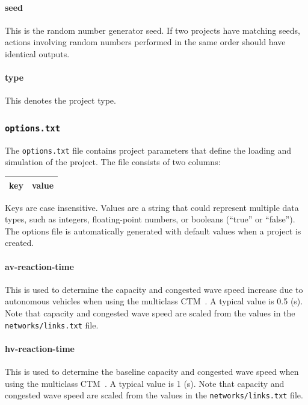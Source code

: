 \paragraph*{seed}
This is the random number generator seed. If two projects have matching seeds, actions involving random numbers performed in the same order should have identical outputs.

\paragraph*{type}
This denotes the project type.


\subsubsection{\texttt{options.txt}}
The \texttt{options.txt} file contains project parameters that define the loading and simulation of the project. The file consists of two columns:
\begin{center}
\begin{tabular}{cc}
\hline
key & value\\\hline
\end{tabular}
\end{center}
Keys are case insensitive. Values are a string that could represent multiple data types, such as integers, floating-point numbers, or booleans (``true'' or ``false''). The options file is automatically generated with default values when a project is created. 

\paragraph*{av-reaction-time}
This is used to determine the capacity and congested wave speed increase due to autonomous vehicles when using the multiclass CTM~\cite{levin2016multiclass}. A typical value is 0.5 (s). Note that capacity and congested wave speed are scaled from the values in the \texttt{networks/links.txt} file.

\paragraph*{hv-reaction-time}
This is used to determine the baseline capacity and congested wave speed when using the multiclass CTM~\cite{levin2016multiclass}. A typical value is 1 (s). Note that capacity and congested wave speed are scaled from the values in the \texttt{networks/links.txt} file.

